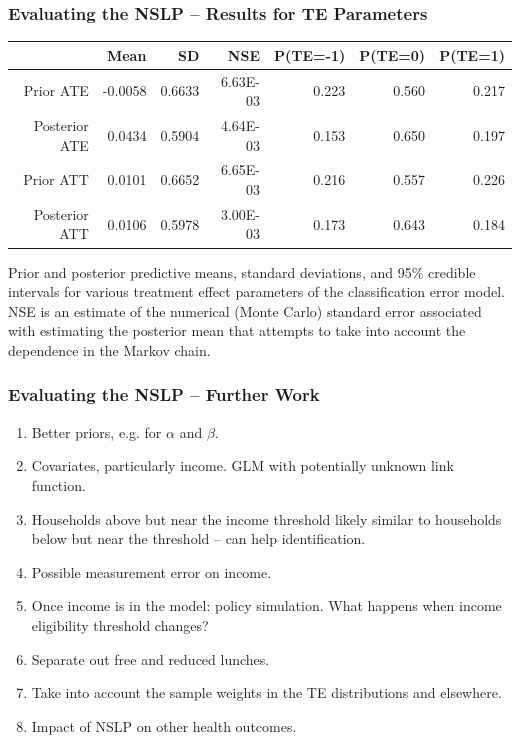 \documentclass[xcolor=dvipsnames]{beamer}
\begin{document}
\begin{frame}[fragile]
\frametitle{Evaluating the NSLP -- Results for TE Parameters}
  
\begin{table}[ht]
\centering
{\footnotesize
\begin{tabular}{|r|rrr|rrr|}
  \hline
 & Mean & SD & NSE & P(TE=-1) & P(TE=0) & P(TE=1) \\ 
  \hline
Prior ATE & -0.0058 & 0.6633 & 6.63E-03 & 0.223 & 0.560 & 0.217 \\ 
  Posterior ATE & 0.0434 & 0.5904 & 4.64E-03 & 0.153 & 0.650 & 0.197 \\ 
  Prior ATT & 0.0101 & 0.6652 & 6.65E-03 & 0.216 & 0.557 & 0.226 \\ 
  Posterior ATT & 0.0106 & 0.5978 & 3.00E-03 & 0.173 & 0.643 & 0.184 \\ 
   \hline
\end{tabular}
}
\end{table}
{\footnotesize Prior and posterior predictive means, standard deviations, and 95\% credible intervals for various treatment effect parameters of the classification error model. NSE is an estimate of the numerical (Monte Carlo) standard error associated with estimating the posterior mean that attempts to take into account the dependence in the Markov chain.}
\end{frame}



\begin{frame}[fragile]
\frametitle{Evaluating the NSLP -- Further Work}
  \begin{enumerate}
\item Better priors, e.g. for $\alpha$ and $\beta$.
\item Covariates, particularly income. GLM with potentially unknown link function.
\item Households above but near the income threshold likely similar to households below but near the threshold -- can help identification.
\item Possible measurement error on income.
\item Once income is in the model: policy simulation. What happens when income eligibility threshold changes?
\item Separate out free and reduced lunches.
\item Take into account the sample weights in the TE distributions and elsewhere.
\item Impact of NSLP on other health outcomes.\\~\\
  \end{enumerate}
  
\end{frame}
\end{document}
